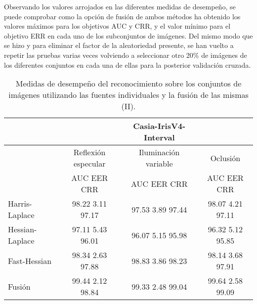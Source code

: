 Observando los valores arrojados en las diferentes medidas de desempeño, se puede comprobar como la opción de fusión de ambos métodos ha obtenido los valores máximos para los objetivos AUC y CRR, y el valor mínimo para el objetivo ERR en cada uno de los subconjuntos de imágenes. Del mismo modo que se hizo y para eliminar el factor de la aleatoriedad presente, se han vuelto a repetir las pruebas varias veces volviendo a seleccionar otro 20\% de imágenes de los diferentes conjuntos en cada una de ellas para la posterior validación cruzada. \\

\begin{table}[h]
\begin{center}
\begin{tabular}{@{}lccc@{}}
\toprule
&& Casia-IrisV4-Interval & \\ \hline
&Reflexión especular		&  	Iluminación variable		& Oclusión \\ \hline
&AUC  \phantom{aa} EER  \phantom{aa} CRR &  	AUC  \phantom{aa} EER  \phantom{aa} CRR		& AUC  \phantom{aa} EER  \phantom{aa} CRR \\ \hline
Harris-Laplace& 98.22 \phantom{aa} 3.11  \phantom{aa} 97.17 &  	97.53 \phantom{aa} 3.89  \phantom{aa}97.44		& 98.07 \phantom{aa} 4.21 \phantom{aa} 97.11 \\
Hessian-Laplace& 97.11 \phantom{aa} 5.43  \phantom{aa} 96.01 &  	96.07 \phantom{aa} 5.15 \phantom{aa} 95.98 & 96.32 \phantom{aa} 5.12 \phantom{aa} 95.85 \\
Fast-Hessian& 98.34  \phantom{aa}2.63 \phantom{aa}  97.88 &  	98.83 \phantom{aa} 3.86  \phantom{aa}98.23		& 98.14  \phantom{aa}3.68 \phantom{aa} 97.91 \\
Fusión& 99.44 \phantom{aa} 2.12  \phantom{aa}98.84 &  	99.33  \phantom{aa}2.48 \phantom{aa} 99.04		& 99.64 \phantom{aa} 2.58  \phantom{aa}99.09 \\ \hline

\end{tabular}
\end{center}
\caption{Medidas de desempeño del reconocimiento sobre los conjuntos de imágenes utilizando las fuentes individuales y la fusión de las mismas (II).}
\label{my_tabla}
\end{table}

